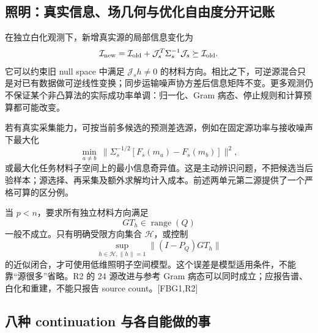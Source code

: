 \documentclass[10pt,a4paper]{article}
\begin{document}
\hypertarget{ux7167ux660eux771fux5b9eux4fe1ux606fux573aux51e0ux4f55ux4e0eux4f18ux5316ux81eaux7531ux5ea6ux5206ux5f00ux8bb0ux8d26}{%
\subsection{照明：真实信息、场几何与优化自由度分开记账}\label{ux7167ux660eux771fux5b9eux4fe1ux606fux573aux51e0ux4f55ux4e0eux4f18ux5316ux81eaux7531ux5ea6ux5206ux5f00ux8bb0ux8d26}}

在独立白化观测下，新增真实源的局部信息变化为
\[\mathcal I_{\rm new}=\mathcal I_{\rm old}+\mathcal J_s^T\Sigma_s^{-1}\mathcal J_s\succeq\mathcal I_{\rm old}.\]
它可以约束旧 null space 中满足 \(\mathcal J_sh\ne0\)
的材料方向。相比之下，可逆源混合只是对已有数据做可逆线性变换；同步运输噪声协方差后信息矩阵不变。更多观测仍不保证某个非凸算法的实际成功率单调：归一化、Gram
病态、停止规则和计算预算都可能改变。

若有真实采集能力，可按当前多候选的预测差选源，例如在固定源功率与接收噪声下最大化
\[\min_{a\ne b}\ \|\Sigma_s^{-1/2}[F_s(m_a)-F_s(m_b)]\|^2,\]
或最大化任务材料子空间上的最小信息奇异值。这是主动辨识问题，不把候选当后验样本；源选择、再采集及额外求解均计入成本。前述两单元第二源提供了一个严格可算的区分例。

当 \(p<n\)，要求所有独立材料方向满足 \[GT_h\in\operatorname{range}(Q)\]
一般不成立。只有明确受限方向集合 \(\mathcal H\)，或控制
\[\sup_{h\in\mathcal H,\|h\|=1}\|(I-P_Q)GT_h\|\]
的近似闭合，才可使用低维照明子空间模型。这个误差是模型适用条件，不能靠``源很多''省略。R2
的 24 源改进与参考 Gram
病态可以同时成立；应报告谱、白化和重建，不能只报告 source
count。{[}FBG1,R2{]}

\hypertarget{ux516bux79cd-continuation-ux4e0eux5404ux81eaux80fdux505aux7684ux4e8b}{%
\subsection{八种 continuation
与各自能做的事}\label{ux516bux79cd-continuation-ux4e0eux5404ux81eaux80fdux505aux7684ux4e8b}}
\end{document}
